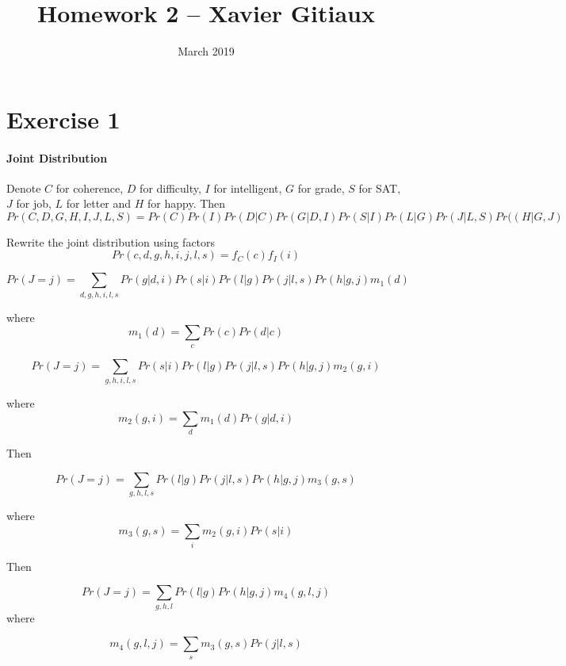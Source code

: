 \documentclass{article}
\title{Homework 2 -- Xavier Gitiaux}
\author{}
\date{March 2019}
\begin{document}
\maketitle

\section{Exercise 1}
\paragraph{Joint Distribution}
Denote $C$ for coherence, $D$ for difficulty, $I$ for intelligent, $G$ for grade, $S$ for SAT, $J$ for job, $L$ for letter and $H$ for happy. Then
\begin{equation}
\nonumber
Pr(C, D, G, H, I, J, L, S)=Pr(C)Pr(I)Pr(D|C)Pr(G|D, I)Pr(S|I)Pr(L|G)Pr(J|L, S)Pr((H|G, J)
\end{equation}

Rewrite the joint distribution using factors
\begin{equation}
\nonumber
Pr(c, d, g, h, i, j, l, s)=f_{C}(c)f_{I}(i)
\end{equation}


\begin{equation}
Pr(J=j) = \displaystyle\sum_{d, g, h, i, l, s}Pr(g|d, i)Pr(s|i)Pr(l|g)Pr(j|l, s)Pr(h|g, j)m_{1}(d)
\end{equation}

where $$m_{1}(d)=\displaystyle\sum_{c}Pr(c)Pr(d|c)$$

\begin{equation}
Pr(J=j) = \displaystyle\sum_{g, h, i, l, s}Pr(s|i)Pr(l|g)Pr(j|l, s)Pr(h|g, j)m_{2}(g, i)
\end{equation}

where $$m_{2}(g, i)=\displaystyle\sum_{d}m_{1}(d)Pr(g|d, i)$$


Then

\begin{equation}
Pr(J=j) = \displaystyle\sum_{g, h, l, s}Pr(l|g)Pr(j|l, s)Pr(h|g, j)m_{3}(g, s)
\end{equation}

where $$m_{3}(g, s)=\displaystyle\sum_{i}m_{2}(g, i)Pr(s|i)$$

Then

\begin{equation}
Pr(J=j) = \displaystyle\sum_{g, h, l}Pr(l|g)Pr(h|g, j)m_{4}(g, l, j)
\end{equation}
where 

$$m_{4}(g, l, j)=\displaystyle\sum_{s}m_{3}(g, s)Pr(j|l, s)$$
\end{document}
